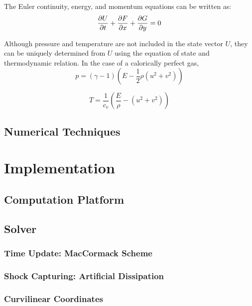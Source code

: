 \documentclass[paper=a4, fontsize=11pt]{scrartcl}
\numberwithin{equation}{section}        %
\numberwithin{figure}{section}          %
\numberwithin{table}{section}               %
\begin{document}
The Euler continuity, energy, and momentum equations can be written as:
\begin{equation}
    \pdv{U}{t} + \pdv{F}{x} + \pdv{G}{y} = 0
\end{equation}

Although pressure and temperature are not included in the state vector $U$, they can be uniquely determined from $U$ using the equation of state and thermodynamic relation. In the case of a calorically perfect gas,
\begin{equation}
    p = (\gamma - 1) \left( E - \frac{1}{2} \rho (u^2 + v^2) \right)
\end{equation}

\begin{equation}
    T = \frac{1}{c_v} \left( \frac{E}{\rho} - (u^2 + v^2) \right)
\end{equation}

\subsection{Numerical Techniques}



\section{Implementation}
\subsection{Computation Platform}

\subsection{Solver}
\subsubsection{Time Update: MacCormack Scheme}

\subsubsection{Shock Capturing: Artificial Dissipation}

\subsubsection{Curvilinear Coordinates}
\end{document}
